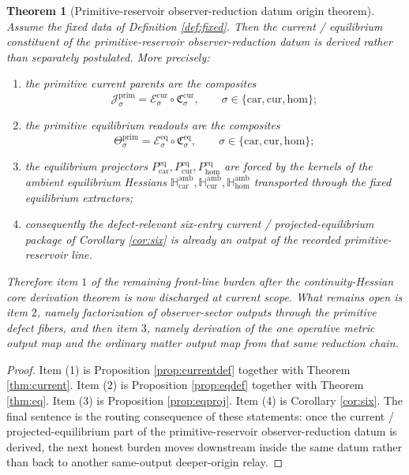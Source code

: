 \documentclass[11pt]{article}
\newcommand{\Car}{\mathrm{car}}
\newcommand{\Cur}{\mathrm{cur}}
\newcommand{\Hom}{\mathrm{hom}}
\newcommand{\PrimCurrent}[1]{\mathcal J_{#1}^{\mathrm{prim}}}
\newcommand{\PrimTheta}[1]{\Theta_{#1}^{\mathrm{prim}}}
\newcommand{\EqProj}[1]{P_{#1}^{\mathrm{eq}}}
\newcommand{\CurrentCarrier}[1]{\mathfrak C_{#1}^{\mathrm{cur}}}
\newcommand{\EqCarrier}[1]{\mathfrak C_{#1}^{\mathrm{eq}}}
\newcommand{\CurrentExtract}[1]{\mathscr E_{#1}^{\mathrm{cur}}}
\newcommand{\EqExtract}[1]{\mathscr E_{#1}^{\mathrm{eq}}}
\newcommand{\AmbientHess}[1]{\mathbb H_{#1}^{\mathrm{amb}}}
\newtheorem{theorem}{Theorem}
\begin{document}
\begin{theorem}[Primitive-reservoir observer-reduction datum origin theorem]
\label{thm:main}
Assume the fixed data of Definition \ref{def:fixed}. Then the current / equilibrium constituent of the primitive-reservoir observer-reduction datum is derived rather than separately postulated. More precisely:
\begin{enumerate}
    \item the primitive current parents are the composites
    \[
    \PrimCurrent{\sigma}
    =
    \CurrentExtract{\sigma}\circ \CurrentCarrier{\sigma},
    \qquad
    \sigma\in\{\Car,\Cur,\Hom\};
    \]
    \item the primitive equilibrium readouts are the composites
    \[
    \PrimTheta{\sigma}
    =
    \EqExtract{\sigma}\circ \EqCarrier{\sigma},
    \qquad
    \sigma\in\{\Car,\Cur,\Hom\};
    \]
    \item the equilibrium projectors \(\EqProj{\Car},\EqProj{\Cur},\EqProj{\Hom}\) are forced by the kernels of the ambient equilibrium Hessians \(\AmbientHess{\Car},\AmbientHess{\Cur},\AmbientHess{\Hom}\) transported through the fixed equilibrium extractors;
    \item consequently the defect-relevant six-entry current / projected-equilibrium package of Corollary \ref{cor:six} is already an output of the recorded primitive-reservoir line.
\end{enumerate}
Therefore item \(1\) of the remaining front-line burden after the continuity-Hessian core derivation theorem is now discharged at current scope. What remains open is item \(2\), namely factorization of observer-sector outputs through the primitive defect fibers, and then item \(3\), namely derivation of the one operative metric output map and the ordinary matter output map from that same reduction chain.
\end{theorem}

\begin{proof}
Item (1) is Proposition \ref{prop:currentdef} together with Theorem \ref{thm:current}. Item (2) is Proposition \ref{prop:eqdef} together with Theorem \ref{thm:eq}. Item (3) is Proposition \ref{prop:eqproj}. Item (4) is Corollary \ref{cor:six}. The final sentence is the routing consequence of these statements: once the current / projected-equilibrium part of the primitive-reservoir observer-reduction datum is derived, the next honest burden moves downstream inside the same datum rather than back to another same-output deeper-origin relay.
\end{proof}
\end{document}

